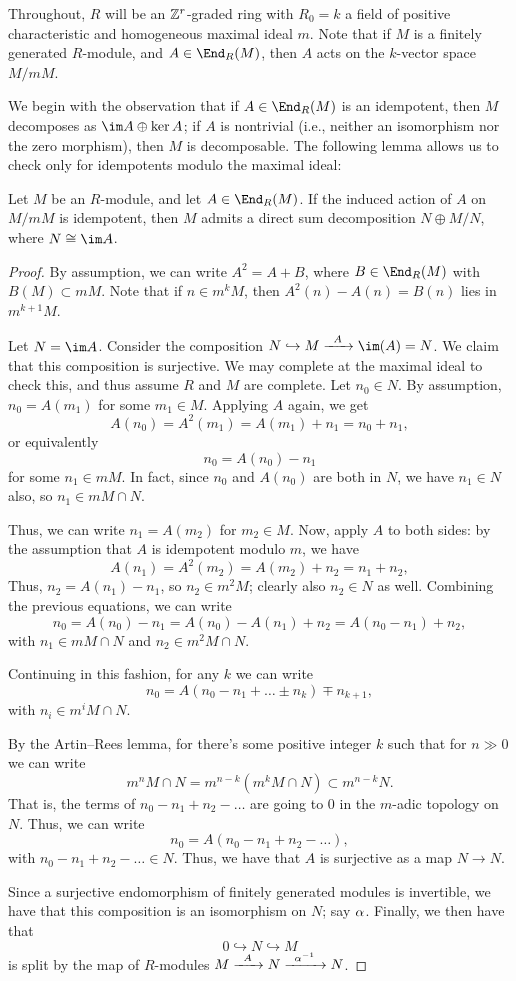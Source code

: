\documentclass{article}
\let\inc\hookrightarrow
\numberwithin{equation}{section}
\theoremstyle{theorem}
\numberwithin{thm}{section}
\theoremstyle{definition}
\begin{document}
Throughout, $R$ will be an $\mathbb Z^r$-graded ring with $R_0 = k$ a field of positive characteristic and homogeneous maximal ideal $m$. Note that if $M$ is a finitely generated $R$-module, and $A\in \End_R(M)$, then $A$ acts on the $k$-vector space $M/mM$.

We begin with the observation that if $A\in\End_R(M)$ is an idempotent, then $M$ decomposes as $\im A \oplus \ker A$; if $A$ is nontrivial (i.e., neither an isomorphism nor the zero morphism), then $M$ is decomposable. The following lemma allows us to check only for idempotents modulo the maximal ideal:

\begin{lem}\label{idem}
  Let $M$ be an $R$-module, and let $A\in\End_R(M)$. If the induced action of $A$ on $M/mM$ is idempotent, then $M$ admits a direct sum decomposition $N\oplus M/N$, where $N\cong \im A$.
\end{lem}
\begin{proof}
  By assumption, we can write $A^2 = A + B$, where $B\in\End_R(M)$ with $B(M)\subset mM$.
  Note that if $n \in m^kM$, then $A^2(n) - A(n) = B(n)$  lies in $m^{k+1}M$.

  Let $N = \im A$. Consider the composition $N\inc M \xra{A} \im(A) = N$. We claim that this composition is surjective. We may complete at the maximal ideal to check this, and thus assume $R$ and $M$ are complete. Let $n_0\in N$. By assumption, $n_0=A(m_1)$ for some $m_1\in M$. Applying $A$ again, we get
  \[ A(n_0) = A^2(m_1) = A(m_1) + n_1 = n_0 + n_1, \]
  or equivalently
  \[ n_0 = A(n_0) - n_1 \]
  for some $n_1\in mM$. In fact, since $n_0$ and $A(n_0)$ are both in $N$, we have $n_1\in N$ also, so $n_1\in mM\cap N$.

  Thus, we can write $n_1 = A(m_2)$ for $m_2\in M$.
  Now, apply $A$ to both sides: by the assumption that $A$ is idempotent modulo $m$, we have
  \[ A(n_1)=A^2(m_2) = A(m_2) + n_2 = n_1+n_2, \]
  Thus, $n_2=A(n_1)-n_1$, so $n_2\in m^2M$; clearly also $n_2\in N$ as well.
  Combining the previous equations, we can write
  \[ n_0 = A(n_0) - n_1 = A(n_0) - A(n_1) + n_2 = A(n_0 - n_1) + n_2, \]
  with $n_1\in mM\cap N$ and $n_2\in m^2M\cap N$.

  Continuing in this fashion, for any $k$ we can write
  \[ n_0=A(n_0-n_1+\dots \pm n_k) \mp n_{k+1}, \]
  with $n_i \in m^i M\cap N$.

  By the Artin--Rees lemma, for there's some positive integer $k$ such that for $n\gg0$ we can write
  \[ m^n M\cap N = m^{n-k} ( m^kM\cap N)\subset m^{n-k} N. \]
  That is, the terms of $n_0-n_1+n_2-\dots$ are going to 0 in the $m$-adic topology on $N$. Thus, we can write
  \[ n_0=A(n_0-n_1+n_2-\dots), \]
  with $n_0-n_1+n_2-\dots\in N$. Thus, we have that $A$ is surjective as a map $N\to N$.

  Since a surjective endomorphism of finitely generated modules is invertible, we have that this composition is an isomorphism on $N$; say $\alpha$.
  Finally, we then have that
  \[ 0 \inc N \inc M \]
  is split by the map of $R$-modules $M\xra A N\xra{\a\inv} N$.
\end{proof}
\end{document}
